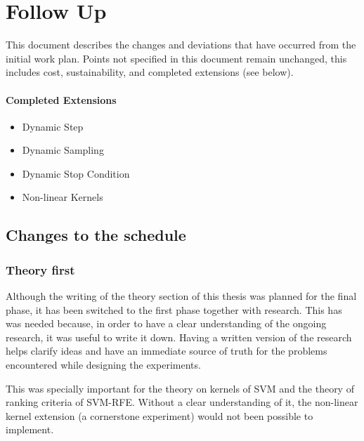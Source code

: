 \newcommand{\VS}{\vspace{6pt}}
\newcommand{\vt}[1]{\vec{#1}}

\chapter{Follow Up} %

\label{Chapter1} %


This document describes the changes and deviations that have occurred from the initial work plan. Points not specified in this document remain unchanged, this includes cost, sustainability, and completed extensions (see below).

\subsubsection*{Completed Extensions}
\begin{itemize}
    \item Dynamic Step
    \item Dynamic Sampling
    \item Dynamic Stop Condition
    \item Non-linear Kernels
\end{itemize}

\section{Changes to the schedule}

\subsection{Theory first}

Although the writing of the theory section of this thesis was planned for the final phase, it has been switched to the first phase together with research. This has was needed because, in order to have a clear understanding of the ongoing research, it was useful to write it down. Having a written version of the research helps clarify ideas and have an immediate source of truth for the problems encountered while designing the experiments.

This was specially important for the theory on kernels of SVM and the theory of ranking criteria of SVM-RFE. Without a clear understanding of it, the non-linear kernel extension (a cornerstone experiment) would not been possible to implement.

